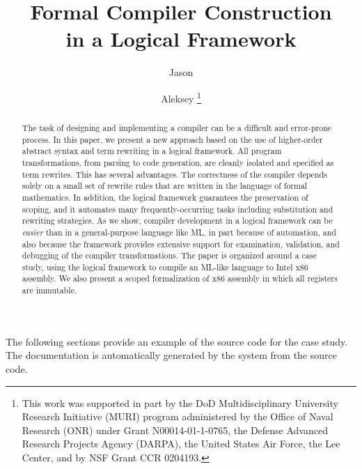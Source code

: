 \documentclass[numreferences,copyrighthead,noid]{kluwer}
\begin{document}
\begin{article}
\begin{opening}

\title{Formal Compiler Construction\\ in a Logical Framework}

\author{Jason \footnotemark\addtocounter{footnote}{-1}}
\author{Aleksey \thanks{This
  work was supported in part by the DoD Multidisciplinary
  University Research Initiative (MURI) program administered by the
  Office of Naval Research (ONR) under Grant N00014-01-1-0765, the
  Defense Advanced Research Projects Agency (DARPA), the United States
  Air Force, the Lee Center, and by NSF Grant CCR 0204193.}}


\begin{abstract}
The task of designing and implementing a compiler can be a
difficult and error-prone process.  In this paper, we present a new
approach based on the use of higher-order abstract syntax and term
rewriting in a logical framework.  All program transformations, from
parsing to code generation, are cleanly isolated and specified as term
rewrites.  This has several advantages.  The correctness of the
compiler depends solely on a small set of rewrite rules that are
written in the language of formal mathematics.  In addition, the logical
framework guarantees the preservation of scoping, and it automates
many frequently-occurring tasks including substitution and rewriting
strategies.  As we show, compiler development in a logical framework
can be \emph{easier} than in a general-purpose language like ML, in
part because of automation, and also because the framework provides
extensive support for examination, validation, and debugging of the
compiler transformations.  The paper is organized around a case study,
using the \MetaPRL{} logical framework to compile an ML-like language to
Intel x86 assembly.  We also present a scoped formalization of x86
assembly in which all registers are immutable.

\end{abstract}
\end{opening}
\renewcommand\floatpagefraction{1.0}






\appendix

The following sections provide an example of the source code for the
case study.  The documentation is automatically generated by the
\MetaPRL{} system from the source code.



\end{article}
\end{document}
